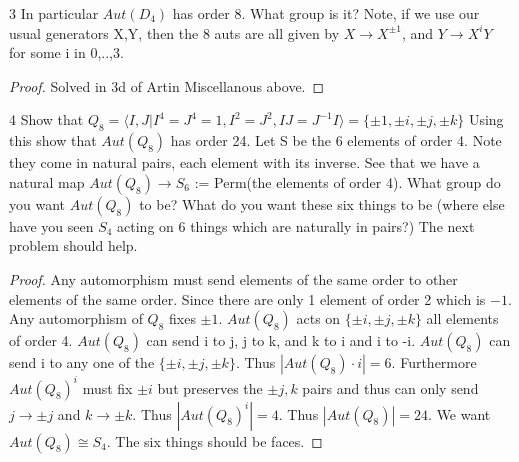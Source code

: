 \documentclass{article}
\begin{document}
\bigskip

\begin{PROB}{3}\label{Problem 3.}
    In particular $ Aut(D_4)$ has order 8. What group is it?   Note, if we use our usual generators X,Y, then the 8 auts are all given by  $X \to X^{\pm 1}$, and $Y \to X^i Y$ for some i in 0,..,3.  
\end{PROB}
\begin{proof}
    Solved in 3d of Artin Miscellanous above.
\end{proof}

\bigskip

\begin{PROB}{4}\label{Problem 4.}
    Show that $Q_8 = \langle I,J| I^4 = J^4 = 1, I^2 = J^2, I J  = J^{-1}I \rangle = \{\pm 1, \pm i, \pm j, \pm k \} $  Using this show that $Aut(Q_8)$ has order 24. Let S be the 6 elements of order 4. Note they come in natural pairs, each element with its inverse.  See that we have a natural map $Aut(Q_8) \to S_6$ := Perm(the elements of order 4). What group do you want $Aut(Q_8)$ to be? What do you want these six things to be (where else have you seen $S_4$ acting on 6 things which are naturally in pairs?)  The next problem should help.
\end{PROB}
\begin{proof}
    Any automorphism must send elements of the same order to other elements of the same order. Since there are only 1 element of order 2 which is $-1$. Any automorphism of $Q_8$ fixes $\pm 1$. $Aut(Q_8)$ acts on $\{\pm i, \pm j, \pm k\}$ all elements of order 4. $Aut(Q_8)$ can send i to j, j to k, and k to i and i to -i. $Aut(Q_8)$ can send i to any one of the $\{\pm i, \pm j, \pm k\}$. Thus $|Aut(Q_8) \cdot i| = 6$. Furthermore $Aut(Q_8)^i$ must fix $\pm i$ but preserves the $\pm j, k$ pairs and thus can only send $j \to \pm j$ and $k \to \pm k$. Thus $|Aut(Q_8)^i| = 4$. Thus $|Aut(Q_8)| = 24$. We want $Aut(Q_8) \cong S_4$. The six things should be faces.
\end{proof}

\bigskip
\end{document}
